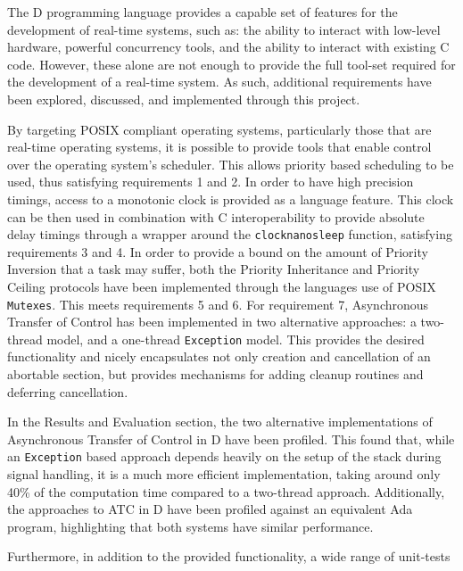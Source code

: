 

The D programming language provides a capable set of features for the 
development of real-time systems, such as: the ability to interact with low-level 
hardware, powerful concurrency tools, and the ability to interact with existing C code. 
However, these alone are not enough to provide the full tool-set required for
the development of a real-time system. 
As such, additional requirements have been explored, discussed, and implemented 
through this project. 
\par\bigskip\noindent
By targeting POSIX compliant operating systems, particularly those that are
real-time operating systems, it is possible to provide tools that enable control 
over the operating system's scheduler. 
This allows priority based scheduling to be used, thus satisfying requirements
1 and 2.
In order to have high precision timings, access to a monotonic clock is provided 
as a language feature. 
This clock can be then used in combination with C
interoperability to provide absolute delay timings through a wrapper around the
\texttt{clock\textunderscore{}nanosleep} function, satisfying requirements 3 and
4. 
In order to provide a bound on the amount of Priority Inversion that a task
may suffer, both the Priority Inheritance and Priority Ceiling protocols have
been implemented through the languages use of POSIX \texttt{Mutexes}. This meets
requirements 5 and 6. 
For requirement 7, Asynchronous Transfer of Control has been implemented in two 
alternative approaches: a two-thread model, and a one-thread \texttt{Exception} model. 
This provides the desired functionality and 
nicely encapsulates not only creation and cancellation of an
abortable section, but provides mechanisms for adding cleanup routines and deferring 
cancellation. 
\par\bigskip\noindent
In the Results and Evaluation section, the two alternative implementations of
Asynchronous Transfer of Control in D have been profiled. 
This found that, while an \texttt{Exception} based approach depends 
heavily on the setup of the stack during signal handling, it is a much more efficient
implementation, taking around only 40\% of the computation time compared to a
two-thread approach. 
Additionally, the approaches to ATC in D have been profiled against an
equivalent Ada program, highlighting that both systems have similar performance.
\par\bigskip\noindent
Furthermore, in addition to the provided functionality, a wide range of unit-tests 
